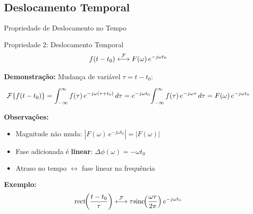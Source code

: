 
\subsection{Deslocamento Temporal}

\begin{frame}{Propriedade de Deslocamento no Tempo}

\begin{block}{Propriedade 2: Deslocamento Temporal}
\[
f(t - t_0) \mathrel{\overset{\mathcal{F}}{\longleftrightarrow}} F(\omega)\, e^{-j\omega t_0}
\]
\end{block}

\textbf{Demonstração:} Mudança de variável $\tau = t - t_0$:

\[
\mathcal{F}\{f(t - t_0)\} = \int_{-\infty}^{\infty} f(\tau)\, e^{-j\omega(\tau + t_0)}\, d\tau
= e^{-j\omega t_0}\!\int_{-\infty}^{\infty} f(\tau)\, e^{-j\omega\tau}\, d\tau
= F(\omega)\,e^{-j\omega t_0}
\]

\textbf{Observações:}
\begin{itemize}
\item Magnitude não muda: $|F(\omega)\,e^{-j\omega t_0}| = |F(\omega)|$
\item Fase adicionada é \textbf{linear}: $\Delta\phi(\omega) = -\omega t_0$
\item Atraso no tempo $\leftrightarrow$ fase linear na frequência
\end{itemize}

\textbf{Exemplo:}
\vspace{-2mm}
\[
\text{rect}\!\!\left(\frac{t-t_0}{\tau}\right) \mathrel{\overset{\mathcal{F}}{\longleftrightarrow}} \tau\text{sinc}\!\!\left(\frac{\omega\tau}{2\pi}\right) e^{-j\omega t_0}
\]

\end{frame}


